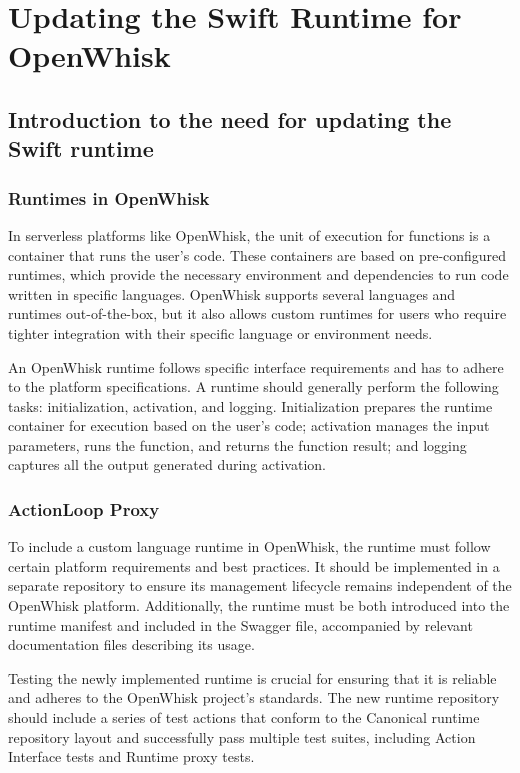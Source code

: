 \chapter{Updating the Swift Runtime for OpenWhisk}
\etocsettocstyle{\rule{\textwidth}{1pt}}{\rule{\textwidth}{1pt}} %
\localtableofcontents

\section{Introduction to the need for updating the Swift runtime}
\subsection{Runtimes in OpenWhisk}

In serverless platforms like OpenWhisk, the unit of execution for functions is a container that runs the user's code. These containers are based on pre-configured runtimes, which provide the necessary environment and dependencies to run code written in specific languages. OpenWhisk supports several languages and runtimes out-of-the-box, but it also allows custom runtimes for users who require tighter integration with their specific language or environment needs.

An OpenWhisk runtime follows specific interface requirements and has to adhere to the platform specifications. A runtime should generally perform the following tasks: initialization, activation, and logging. Initialization prepares the runtime container for execution based on the user's code; activation manages the input parameters, runs the function, and returns the function result; and logging captures all the output generated during activation.

\subsection{ActionLoop Proxy}

To include a custom language runtime in OpenWhisk, the runtime must follow certain platform requirements and best practices. It should be implemented in a separate repository to ensure its management lifecycle remains independent of the OpenWhisk platform. Additionally, the runtime must be both introduced into the runtime manifest and included in the Swagger file, accompanied by relevant documentation files describing its usage.

Testing the newly implemented runtime is crucial for ensuring that it is reliable and adheres to the OpenWhisk project's standards. The new runtime repository should include a series of test actions that conform to the Canonical runtime repository layout and successfully pass multiple test suites, including Action Interface tests and Runtime proxy tests.

